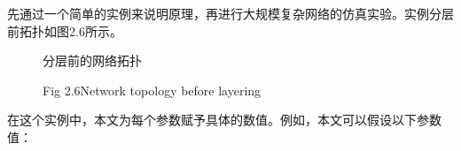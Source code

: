 \documentclass[UTF8,a4paper,12pt]{ctexart}
\numberwithin{equation}{section}
\begin{document}
	先通过一个简单的实例来说明原理，再进行大规模复杂网络的仿真实验。实例分层前拓扑如图2.6所示。
	\begin{figure}[htb]
		\caption{分层前的网络拓扑}
		\vspace{-10pt}
		\caption*{Fig 2.6\quad Network topology before layering}
	\end{figure}
	
	在这个实例中，本文为每个参数赋予具体的数值。例如，本文可以假设以下参数值：
	
\end{document}
